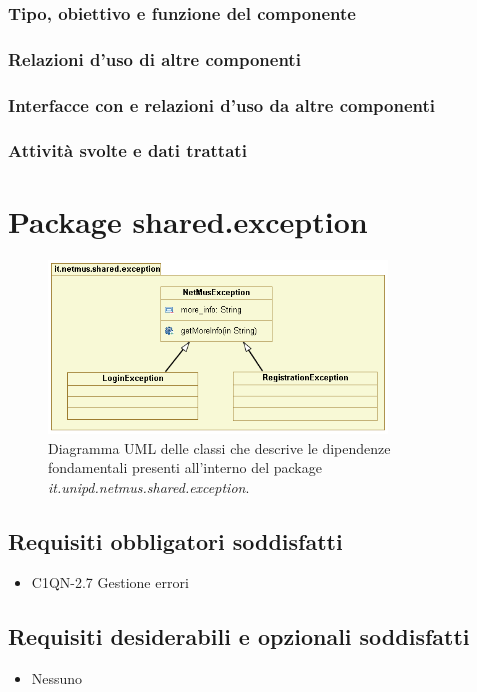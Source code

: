 \subsubsection*{Tipo, obiettivo e funzione del componente}
\subsubsection*{Relazioni d'uso di altre componenti}
\subsubsection*{Interfacce con e relazioni d'uso da altre componenti}
\subsubsection*{Attivit\`a svolte e dati trattati}



\newpage
\section{Package shared.exception}

\begin{figure}[!h]
  \centering
  \includegraphics[width=9cm]{img/DP/classes_shared_exception.png}
\caption{Diagramma UML delle classi che descrive le dipendenze
fondamentali presenti all'interno del package
\emph{it.unipd.netmus.shared.exception}.}
\end{figure}


\subsection*{Requisiti obbligatori soddisfatti}
\begin{itemize}
	\item C1QN-2.7 Gestione errori
\end{itemize}
\subsection*{Requisiti desiderabili e opzionali soddisfatti}
\begin{itemize}
    \item Nessuno
\end{itemize}
